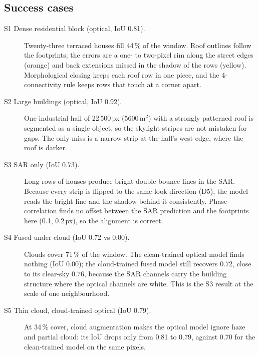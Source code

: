 \subsection*{Success cases}
\begin{description}
\item[S1 Dense residential block (optical, IoU 0.81).] Twenty-three terraced houses fill
44\,\% of the window. Roof outlines follow the footprints; the errors are a one- to two-pixel
rim along the street edges (orange) and back extensions missed in the shadow of the rows
(yellow). Morphological closing keeps each roof row in one piece, and the 4-connectivity
rule keeps rows that touch at a corner apart.
\item[S2 Large buildings (optical, IoU 0.92).] One industrial hall of 22\,500\,px
(5600\,m$^2$) with a strongly patterned roof is segmented as a single object, so the
skylight stripes are not mistaken for gaps. The only miss is a narrow strip at the hall's
west edge, where the roof is darker.
\item[S3 SAR only (IoU 0.73).] Long rows of houses produce bright double-bounce lines in
the SAR. Because every strip is flipped to the same look direction (D5), the model reads
the bright line and the shadow behind it consistently. Phase correlation finds no offset
between the SAR prediction and the footprints here (0.1, 0.2\,px), so the alignment is
correct.
\item[S4 Fused under cloud (IoU 0.72 vs 0.00).] Clouds cover 71\,\% of the window. The
clean-trained optical model finds nothing (IoU 0.00); the cloud-trained fused model still
recovers 0.72, close to its clear-sky 0.76, because the SAR channels carry the building
structure where the optical channels are white. This is the S3 result at the scale of one
neighbourhood.
\item[S5 Thin cloud, cloud-trained optical (IoU 0.79).] At 34\,\% cover, cloud augmentation
makes the optical model ignore haze and partial cloud: its IoU drops only from 0.81 to
0.79, against 0.70 for the clean-trained model on the same pixels.
\end{description}

